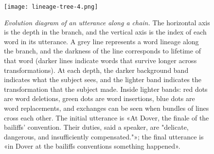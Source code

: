 \documentclass[english,]{article}
\begin{document}
\begin{figure}[!ht]
	\centering
	\texttt{[image: lineage-tree-4.png]}
	\caption{\emph{Evolution diagram of an utterance along a chain.}
	The horizontal axis is the depth in the branch, and the vertical axis is the index of each word in its utterance.
	A grey line represents a word lineage along the branch, and the darkness of the line corresponds to lifetime of that word (darker lines indicate words that survive longer across transformations).
	At each depth, the darker background band indicates what the subject sees, and the lighter band indicates the transformation that the subject made.
	Inside lighter bands: red dots are word deletions, green dots are word insertions, blue dots are word replacements, and exchanges can be seen when bundles of lines cross each other.
	The initial utterance is «At Dover, the finale of the bailiffs' convention. Their duties, said a speaker, are "delicate, dangerous, and insufficiently compensated."»\autocite{feneon_novels_2007};
	the final utterance is «in Dover at the bailiffs conventions something happened».}
	\label{fig:lineage}
\end{figure}
\end{document}

